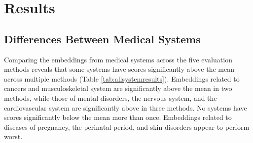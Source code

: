 \documentclass[10pt]{article}
\begin{document}
\section{Results}

\subsection{Differences Between Medical Systems}

Comparing the embeddings from medical systems across the five evaluation methods reveals that some systems have scores significantly above the mean across multiple methods (Table \ref{tab:allsystemresults}). Embeddings related to cancers and musculoskeletal system are significantly above the mean in two methods, while those of mental disorders, the nervous system, and the cardiovascular system are significantly above in three methods. No systems have scores significantly below the mean more than once. Embeddings related to diseases of pregnancy, the perinatal period, and skin disorders appear to perform worst.  
\end{document}
